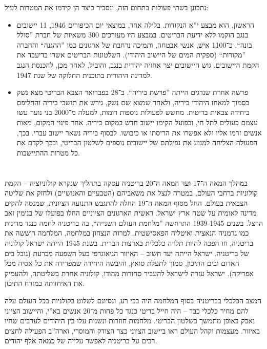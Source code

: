 \documentclass[]{../../../../tex/classes/homework}
\begin{document}
	נתבונן בשתי פעולות בתחום הזה, ונסביר כיצד הן קידמו את המטרות לעיל: 
	\begin{itemize}
		\item הראשון, הוא מבצע י''א הנקודות. בלילה אחד, במוצאי יום הכיפורים 1946, 11 יישובים בנגב הוקמו ללא ידיעת הבריטים. במבצע היו מעורכים 300 משאיות של חברת ''סולל בונה``, כ־1100 איש, אנשי אבטחה, ותמיכה נרחבת של ארגונים כמו ''ההגנה`` והחברה ''מקורות`` (ספקית המים של היישוב היהודי). השלטונות הבריטים אשרו בדיעבד את הקמת היישובים. גוש היישובים יצר אחזיה יהודית בנגב, והוביל, לאחר מכן, להכנסת הנגב למדינה היהודית בתוכנית החלוקה של שנת 1947. 
		\item פרשה אחרת שנדגים הייתה ''פרשת ביריה``. ב־28 בפברואר הצבא הבריטי מצא נשק בסמוך למאחז היהודי ביריה, ולאחר שמצא שם נשק, גירש את תושבי ביריה והחליפם ביחידה צבאית בריטית. מחשש לפעולות נוספות דומות, למעלה מ־2000 בני נוער עשו עצמם כעולים לתל חי, ובפועל הקימו יישוב חדש במקום ביריה. אחר פינוי המקום, מאות אנשים זרמו אליו ולא אפשרו את הריסתו או כיבושו. לבסוף ביריה נשאר יישוב עברי. בכך, הפעולה הצליחה למנוע את נפילתם של יישובים נוספים לשלטון הבריטי, ובכך לקדם את כל מטרות ההתיישבות. 
	\end{itemize}
	
	\section{}
	במהלך המאה ה־17 ועד המאה ה־20 בריטניה עסקה בתהליך שנקרא קולוניזציה – הקמת קולוניות ברחבי העולם, במטרה לנצל את משאביהם (הטבעיים והאנושיים) ולחזק את שליטה הצבאית בעולם. החל מסוף המאה ה־19 החלה להתגבש התנועה הציונית, שמנסה להקים מדינה לאומית על שטח ארץ ישראל. ראשית הארגונים הציוניים החלו בפועלו של בנימין זאב הרצל. בשנים 1939-1945 התרחשה ''מלחמת העולם השנייה``, בה בריטניה לחמה כנגד מדינות כמו גרמניה הנאצית ואיטליה הפאסישטית. למרות הנצחון במלחמה, המלחמה רוששה את בריטניה, וזו הפכה להיות תלויה כלכלית בארצות הברית. בשנת 1945 הייתה ישראל קולוניה של בריטניה. ישראל הייתה יעד חשוב – האיזור הגיאוגרפי בעל השפעה מכרעת (גובל בים האדום ובים התיכון, סמוך לתעלת סואץ, והיבשה היחידה שמפרידה את כל אסיה מכל אפריקה). ישראל עזרה לישראל להעביר סחורות מהודו, קולוניה אחרת בשליטתה, ולהעמיק את האיחזותה במזרח התיכון. 
	
	המצב הכלכלי בבריטניה בסוף המלחמה היה בכי רע, ונסיונם לשלוט בקולניות בכל העולם עלה להם מחיר כלכלי כבד – היה חייל בריטי כנגד כל פחות מ־20 אנשים בא''י, והיישוב הציוני נאבק באופן מתמשך בשלטון הבריטי. מלחמות חוזרות ונשנות עלו בין היהודים לערבים שחיו באיזור. מעצמות וקהל העולם ראו ביישוב הציוני כצד הצודק והמוסרי, וארה''ב הפעילה לחצים רבים על בריטניה לאפשר עלייה של כמאה אלף יהודים. 
	
\end{document}
